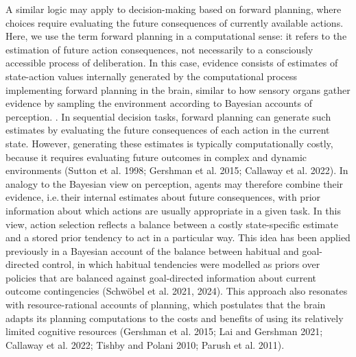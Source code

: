 \documentclass[
  letterpaper,
  DIV=11,
  numbers=noendperiod]{scrartcl}
\begin{document}
A similar logic may apply to decision-making based on forward planning,
where choices require evaluating the future consequences of currently
available actions. Here, we use the term forward planning in a
computational sense: it refers to the estimation of future action
consequences, not necessarily to a consciously accessible process of
deliberation. In this case, evidence consists of estimates of
state-action values internally generated by the computational process
implementing forward planning in the brain, similar to how sensory
organs gather evidence by sampling the environment according to Bayesian
accounts of perception. . In sequential decision tasks, forward planning
can generate such estimates by evaluating the future consequences of
each action in the current state. However, generating these estimates is
typically computationally costly, because it requires evaluating future
outcomes in complex and dynamic environments ({Sutton et al.} 1998;
Gershman et al. 2015; Callaway et al. 2022). In analogy to the Bayesian
view on perception, agents may therefore combine their evidence,
i.e.\,their internal estimates about future consequences, with prior
information about which actions are usually appropriate in a given task.
In this view, action selection reflects a balance between a costly
state-specific estimate and a stored prior tendency to act in a
particular way. This idea has been applied previously in a Bayesian
account of the balance between habitual and goal-directed control, in
which habitual tendencies were modelled as priors over policies that are
balanced against goal-directed information about current outcome
contingencies (Schwöbel et al. 2021, 2024). This approach also resonates
with resource-rational accounts of planning, which postulates that the
brain adapts its planning computations to the costs and benefits of
using its relatively limited cognitive resources (Gershman et al. 2015;
Lai and Gershman 2021; Callaway et al. 2022; Tishby and Polani 2010;
Parush et al. 2011).
\end{document}
